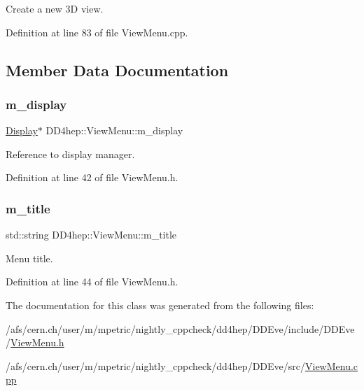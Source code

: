 Create a new 3D view. 

Definition at line 83 of file View\+Menu.\+cpp.



\subsection{Member Data Documentation}
\hypertarget{class_d_d4hep_1_1_view_menu_ac7a1b305e90ceedc0b6294389843473e}{}\label{class_d_d4hep_1_1_view_menu_ac7a1b305e90ceedc0b6294389843473e} 
\subsubsection{\texorpdfstring{m\+\_\+display}{m\_display}}
{\footnotesize\ttfamily \hyperlink{class_d_d4hep_1_1_display}{Display}$\ast$ D\+D4hep\+::\+View\+Menu\+::m\+\_\+display\hspace{0.3cm}{\ttfamily [protected]}}



Reference to display manager. 



Definition at line 42 of file View\+Menu.\+h.

\hypertarget{class_d_d4hep_1_1_view_menu_a1562e57c30d77349a81e1d6e93918293}{}\label{class_d_d4hep_1_1_view_menu_a1562e57c30d77349a81e1d6e93918293} 
\subsubsection{\texorpdfstring{m\+\_\+title}{m\_title}}
{\footnotesize\ttfamily std\+::string D\+D4hep\+::\+View\+Menu\+::m\+\_\+title\hspace{0.3cm}{\ttfamily [protected]}}



Menu title. 



Definition at line 44 of file View\+Menu.\+h.



The documentation for this class was generated from the following files\+:\begin{DoxyCompactItemize}
\item 
/afs/cern.\+ch/user/m/mpetric/nightly\+\_\+cppcheck/dd4hep/\+D\+D\+Eve/include/\+D\+D\+Eve/\hyperlink{_view_menu_8h}{View\+Menu.\+h}\item 
/afs/cern.\+ch/user/m/mpetric/nightly\+\_\+cppcheck/dd4hep/\+D\+D\+Eve/src/\hyperlink{_view_menu_8cpp}{View\+Menu.\+cpp}\end{DoxyCompactItemize}
